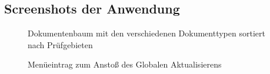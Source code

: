 \subsection{Screenshots der Anwendung}
\label{app:Screenshots}

\begin{figure}[htb]
	\centering
	\caption{Dokumentenbaum mit den verschiedenen Dokumenttypen sortiert nach Prüfgebieten}
\end{figure}

\begin{figure}[htb]
	\centering
	\caption{Menüeintrag zum Anstoß des Globalen Aktualisierens}
\end{figure}
